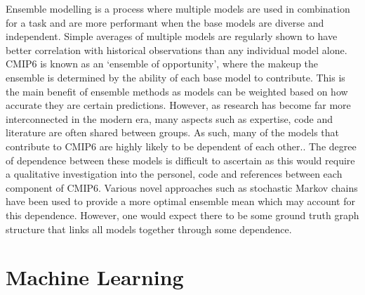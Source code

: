 \documentclass[honours,12pt]{unswthesis}
\numberwithin{equation}{section}
\begin{document}
{\noindent}Ensemble modelling is a process where multiple models are used in combination for a task and are more performant when the base models are diverse and independent\cite{KOTU201919}.
Simple averages of multiple models are regularly shown to have better correlation with historical observations than any individual model alone.\cite{kharin2002climate}\cite{feng2011comparison}
CMIP6 is known as an `ensemble of opportunity'\cite{Knutti2010}, where the makeup the ensemble is determined by the ability of each base model to contribute.\cite{ClimateModelDependenceandtheEnsembleDependenceTransformationofCMIPProjections}
This is the main benefit of ensemble methods as models can be weighted based on how accurate they are certain predictions.
However, as research has become far more interconnected in the modern era, many aspects such as expertise, code and literature are often shared between groups. 
As such, many of the models that contribute to CMIP6 are highly likely to be dependent of each other.\cite{ClimateModelDependenceandtheEnsembleDependenceTransformationofCMIPProjections}. 
The degree of dependence between these models is difficult to ascertain as this would require a qualitative investigation into the personel, code and references between each component of CMIP6.
Various novel approaches such as stochastic Markov chains\cite{Kulinich_2022} have been used to provide a more optimal ensemble mean which may account for this dependence.
However, one would expect there to be some ground truth graph structure that links all models together through some dependence.

{\section{Machine Learning}}\label{ml}
\end{document}
